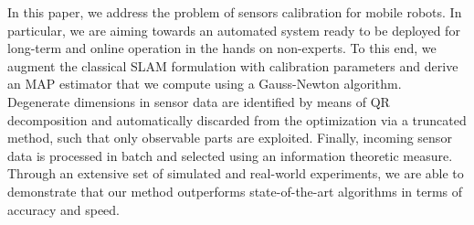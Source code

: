 In this paper, we address the problem of sensors calibration for mobile robots.
In particular, we are aiming towards an automated system ready to be deployed
for long-term and online operation in the hands on non-experts. To this end, we
augment the classical SLAM formulation with calibration parameters and derive
an MAP estimator that we compute using a Gauss-Newton algorithm. Degenerate
dimensions in sensor data are identified by means of QR decomposition and
automatically discarded from the optimization via a truncated method, such that
only observable parts are exploited. Finally, incoming sensor data is processed
in batch and selected using an information theoretic measure. Through an
extensive set of simulated and real-world experiments, we are able to
demonstrate that our method outperforms state-of-the-art algorithms in terms
of accuracy and speed.
